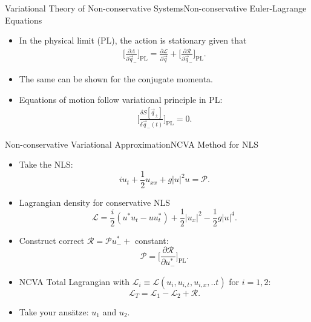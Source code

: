 \begin{frame}[c]{Variational Theory of Non-conservative Systems}{Non-conservative Euler-Lagrange Equations}
\begin{itemize}
\item In the physical limit ($\mathrm{PL}$), the action is stationary given that
\begin{align}
\Bigg[ \frac{\partial \Lambda}{\partial \vec{q}_-} \Bigg]_{\mathrm{PL}} = \frac{\partial \mathcal{L}}{\partial \vec{q}} + \Bigg[ \frac{\partial \mathcal{R} }{\partial \vec{q}_-}\Bigg]_{\mathrm{PL}}. \nonumber
\end{align}
\item The same can be shown for the conjugate momenta.
\item Equations of motion follow variational principle in $\mathrm{PL}$:
\begin{align}
\Bigg[\frac{ \delta S[\vec{q}_{\pm}] }{\delta \vec{q}_- (t)}\Bigg]_{\mathrm{PL}} = 0. \nonumber
\end{align}
\end{itemize}
\end{frame}

\begin{frame}[c]{Non-conservative Variational Approximation}{NCVA Method for NLS}
\small{ 
\begin{itemize}
 \item Take the NLS: \[ i u_t + \frac{1}{2} u_{xx} + g |u|^2 u = \mathcal{P}. \]
\item Lagrangian density for conservative NLS
\[ \mathcal{L} = \frac{i}{2} (u^* u_t - u u^*_t) + \frac{1}{2} |u_x|^2  - \frac{1}{2} g |u|^4. \]
\item Construct correct $\mathcal{R} = \mathcal{P}u_-^* + $ constant: 
\[
\mathcal{P} = \Bigg[ \frac{\partial \mathcal{R}}{\partial u_{-}^*}\Bigg]_{\mathrm{PL}}.  
\]
\item NCVA Total Lagrangian with $\mathcal{L}_i \equiv \mathcal{L}(u_i, u_{i,t}, u_{i,x}, ..t)$ for $i=1,2$:   
\[ \mathcal{L}_T = \mathcal{L}_1- \mathcal{L}_2 + \mathcal{R}. \]
\item Take your ans\"{a}tze:  $u_1$ and $u_2$.
\end{itemize}
}
\end{frame}

